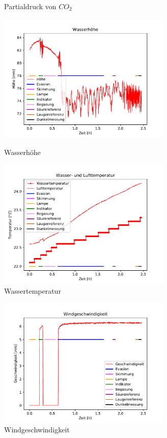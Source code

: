 \documentclass[12pt]{article}
\begin{document}
\begin{figure}[H]
{		\caption{Partialdruck von $CO_2$}
	}
	\centering
	\parbox{82.5mm}{
		\centering
		\includegraphics[width=82.5mm]{VE-Wasser/Wasserhoehe}
		\caption{Wasserh\"ohe }
	}
	\hfill%
	\parbox{82.5mm}{
		\centering
		\includegraphics[width=82.5mm]{VE-Wasser/Wassertemperatur}
		\caption{Wassertemperatur }
	}
\end{figure}
\begin{figure}[H]
	\centering
	\parbox{82.5mm}{
		\centering
		\includegraphics[width=82.5mm]{VE-Wasser/Windgeschwindigkeit}
		\caption{Windgeschwindigkeit}
	}
	\hfill%
	\parbox{82.5mm}{
		\centering
	}
\end{figure}
\end{document}
